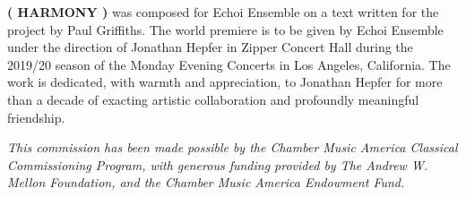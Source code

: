 \textbf{( HARMONY )} was composed for Echoi Ensemble on a text written for the
project by Paul Griffiths. The world premiere is to be given by Echoi Ensemble
under the direction of Jonathan Hepfer in Zipper Concert Hall during the
2019/20 season of the Monday Evening Concerts in Los Angeles, California. The
work is dedicated, with warmth and appreciation, to Jonathan Hepfer for more
than a decade of exacting artistic collaboration and profoundly meaningful
friendship.

\textit{This commission has been made possible by the Chamber Music America
Classical Commissioning Program, with generous funding provided by The Andrew
W. Mellon Foundation, and the Chamber Music America Endowment Fund.}
